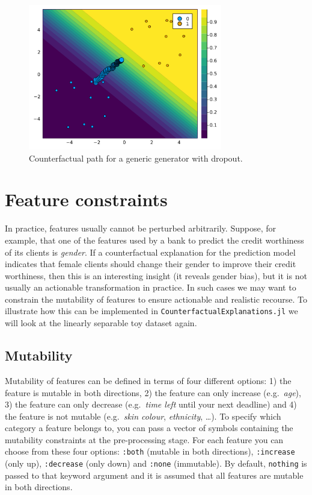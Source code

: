 \documentclass{juliacon}
\begin{document}
\begin{figure}

{\centering \includegraphics[width=3.33333in,height=2.5in]{www/dropout.png}

}

\caption{\label{fig-dropout}Counterfactual path for a generic generator
with dropout.}

\end{figure}

\hypertarget{feature-constraints}{%
\section{Feature constraints}\label{feature-constraints}}

In practice, features usually cannot be perturbed arbitrarily. Suppose,
for example, that one of the features used by a bank to predict the
credit worthiness of its clients is \emph{gender}. If a counterfactual
explanation for the prediction model indicates that female clients
should change their gender to improve their credit worthiness, then this
is an interesting insight (it reveals gender bias), but it is not
usually an actionable transformation in practice. In such cases we may
want to constrain the mutability of features to ensure actionable and
realistic recourse. To illustrate how this can be implemented in
\texttt{CounterfactualExplanations.jl} we will look at the linearly
separable toy dataset again.

\hypertarget{mutability}{%
\subsection{Mutability}\label{mutability}}

Mutability of features can be defined in terms of four different
options: 1) the feature is mutable in both directions, 2) the feature
can only increase (e.g.~\emph{age}), 3) the feature can only decrease
(e.g.~\emph{time left} until your next deadline) and 4) the feature is
not mutable (e.g.~\emph{skin colour}, \emph{ethnicity}, \ldots). To
specify which category a feature belongs to, you can pass a vector of
symbols containing the mutability constraints at the pre-processing
stage. For each feature you can choose from these four options:
\texttt{:both} (mutable in both directions), \texttt{:increase} (only
up), \texttt{:decrease} (only down) and \texttt{:none} (immutable). By
default, \texttt{nothing} is passed to that keyword argument and it is
assumed that all features are mutable in both directions.
\end{document}
